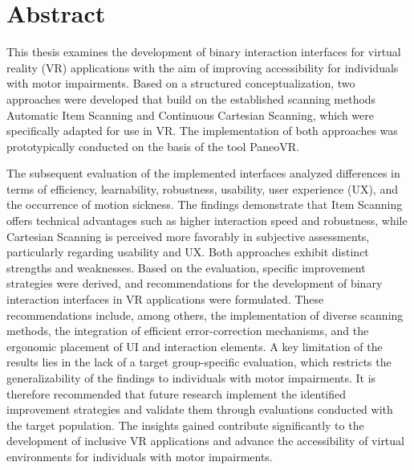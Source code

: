 \chapter{Abstract}

This thesis examines the development of binary interaction interfaces for virtual reality (VR) applications with the aim of improving accessibility for individuals with motor impairments. Based on a structured conceptualization, two approaches were developed that build on the established scanning methods Automatic Item Scanning and Continuous Cartesian Scanning, which were specifically adapted for use in VR. The implementation of both approaches was prototypically conducted on the basis of the tool PaneoVR.

The subsequent evaluation of the implemented interfaces analyzed differences in terms of efficiency, learnability, robustness, usability, user experience (UX), and the occurrence of motion sickness. The findings demonstrate that Item Scanning offers technical advantages such as higher interaction speed and robustness, while Cartesian Scanning is perceived more favorably in subjective assessments, particularly regarding usability and UX.
Both approaches exhibit distinct strengths and weaknesses. Based on the evaluation, specific improvement strategies were derived, and recommendations for the development of binary interaction interfaces in VR applications were formulated. These recommendations include, among others, the implementation of diverse scanning methods, the integration of efficient error-correction mechanisms, and the ergonomic placement of UI and interaction elements.
A key limitation of the results lies in the lack of a target group-specific evaluation, which restricts the generalizability of the findings to individuals with motor impairments. It is therefore recommended that future research implement the identified improvement strategies and validate them through evaluations conducted with the target population. The insights gained contribute significantly to the development of inclusive VR applications and advance the accessibility of virtual environments for individuals with motor impairments.
